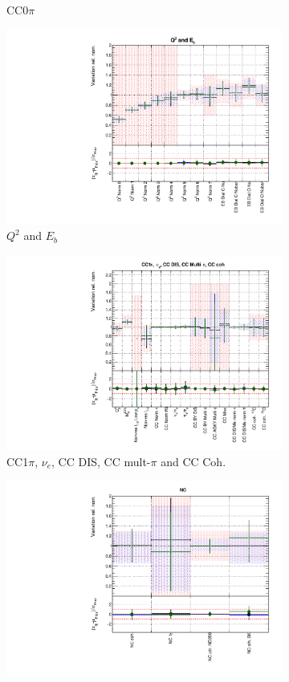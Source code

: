 \begin{figure}[!htbp]
\begin{subfigure}{0.49\textwidth}
  \caption{CC0$\pi$}
\end{subfigure}
\begin{subfigure}{0.49\textwidth}
  \centering
  \includegraphics[width=0.9\linewidth]{figs/polyasmvsxsec_2}
  \caption{$Q^2$ and $E_b$}
\end{subfigure}
\begin{subfigure}{0.49\textwidth}
  \centering
  \includegraphics[width=0.9\linewidth]{figs/polyasmvsxsec_3}
  \caption{CC1$\pi$, $\nu_e$, CC DIS, CC mult-$\pi$ and CC Coh.}
\end{subfigure}
\begin{subfigure}{0.49\textwidth}
  \centering
  \includegraphics[width=0.9\linewidth]{figs/polyasmvsxsec_4}

\end{subfigure}
\end{figure}
